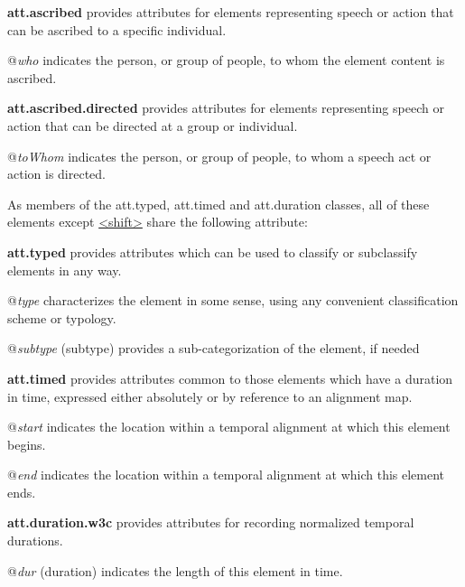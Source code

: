 \begin{sansreflist}
  
\item [\textbf{att.ascribed}] provides attributes for elements representing speech or action that can be ascribed to a specific individual.\hfil\\[-10pt]\begin{sansreflist}
    \item[@{\itshape who}]
  indicates the person, or group of people, to whom the element content is ascribed.
\end{sansreflist}  
\item [\textbf{att.ascribed.directed}] provides attributes for elements representing speech or action that can be directed at a group or individual.\hfil\\[-10pt]\begin{sansreflist}
    \item[@{\itshape toWhom}]
  indicates the person, or group of people, to whom a speech act or action is directed.
\end{sansreflist}  
\end{sansreflist}
 As members of the \textsf{att.typed}, \textsf{att.timed} and \textsf{att.duration} classes, all of these elements except \hyperref[TEI.shift]{<shift>} share the following attribute: 
\begin{sansreflist}
  
\item [\textbf{att.typed}] provides attributes which can be used to classify or subclassify elements in any way.\hfil\\[-10pt]\begin{sansreflist}
    \item[@{\itshape type}]
  characterizes the element in some sense, using any convenient classification scheme or typology.
    \item[@{\itshape subtype}]
  (subtype) provides a sub-categorization of the element, if needed
\end{sansreflist}  
\item [\textbf{att.timed}] provides attributes common to those elements which have a duration in time, expressed either absolutely or by reference to an alignment map.\hfil\\[-10pt]\begin{sansreflist}
    \item[@{\itshape start}]
  indicates the location within a temporal alignment at which this element begins.
    \item[@{\itshape end}]
  indicates the location within a temporal alignment at which this element ends.
\end{sansreflist}  
\item [\textbf{att.duration.w3c}] provides attributes for recording normalized temporal durations.\hfil\\[-10pt]\begin{sansreflist}
    \item[@{\itshape dur}]
  (duration) indicates the length of this element in time.
\end{sansreflist}  
\end{sansreflist}
